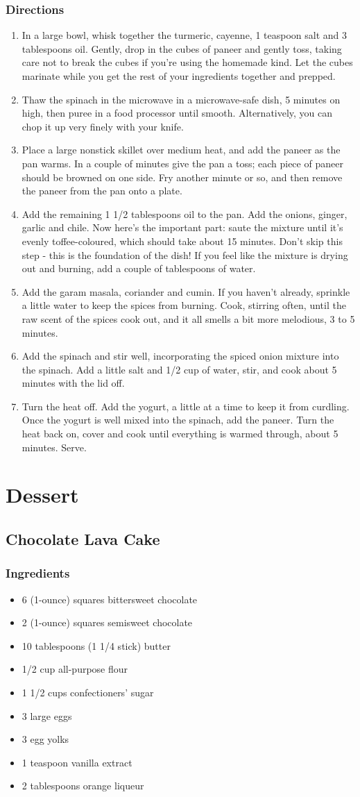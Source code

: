 \documentclass[oneside,11pt]{book}
\newcommand{\Ingredients}[1]{
	\subsection*{Ingredients}
	\begin{itemize} 
	  #1 
	\end{itemize}
}
\newcommand{\Directions}[1]{
	\subsection*{Directions}
	\begin{enumerate} 
	  #1 
	\end{enumerate}
}
\newcommand{\recipe}[1]{
	\section*{ \hspace{-12pt} #1 }
	\addcontentsline{toc}{section}{ \hspace{-6pt} #1 }
}
\begin{document}
	  \Directions{
	    \item In a large bowl, whisk together the turmeric, cayenne, 1 teaspoon salt and 3 tablespoons oil. 
	      Gently, drop in the cubes of paneer and gently toss, taking care not to break the cubes if you're using the homemade kind. 
	      Let the cubes marinate while you get the rest of your ingredients together and prepped.
      \item Thaw the spinach in the microwave in a microwave-safe dish, 5 minutes on high, then puree in a food processor until smooth. 
        Alternatively, you can chop it up very finely with your knife.
      \item Place a large nonstick skillet over medium heat, and add the paneer as the pan warms. 
        In a couple of minutes give the pan a toss; each piece of paneer should be browned on one side. 
        Fry another minute or so, and then remove the paneer from the pan onto a plate.
      \item Add the remaining 1 1/2 tablespoons oil to the pan. 
        Add the onions, ginger, garlic and chile. 
        Now here's the important part: saute the mixture until it's evenly toffee-coloured, which should take about 15 minutes. 
        Don't skip this step - this is the foundation of the dish! 
        If you feel like the mixture is drying out and burning, add a couple of tablespoons of water.
      \item Add the garam masala, coriander and cumin. 
        If you haven't already, sprinkle a little water to keep the spices from burning. 
        Cook, stirring often, until the raw scent of the spices cook out, and it all smells a bit more melodious, 3 to 5 minutes.
      \item Add the spinach and stir well, incorporating the spiced onion mixture into the spinach. 
        Add a little salt and 1/2 cup of water, stir, and cook about 5 minutes with the lid off.
      \item Turn the heat off. 
        Add the yogurt, a little at a time to keep it from curdling. 
        Once the yogurt is well mixed into the spinach, add the paneer. 
        Turn the heat back on, cover and cook until everything is warmed through, about 5 minutes. Serve.
	  }
		
\chapter{Dessert}
  \recipe{Chocolate Lava Cake}
    \Ingredients{
      \item 6 (1-ounce) squares bittersweet chocolate
      \item 2 (1-ounce) squares semisweet chocolate
      \item 10 tablespoons (1 1/4 stick) butter
      \item 1/2 cup all-purpose flour
      \item 1 1/2 cups confectioners' sugar
      \item 3 large eggs
      \item 3 egg yolks
      \item 1 teaspoon vanilla extract
      \item 2 tablespoons orange liqueur
    }
    
\end{document}
